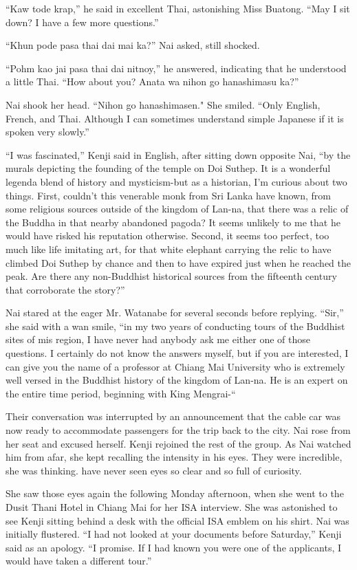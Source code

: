 \documentclass[]{article}
\begin{document}
{“Kaw tode krap,” he said in excellent Thai, astonishing Miss Buatong.  “May I sit down? I have a few more questions.”

“Khun pode pasa thai dai mai ka?” Nai asked, still shocked.

“Pohm kao jai pasa thai dai nitnoy,” he answered, indicating that he understood a little Thai.  “How about you? Anata wa nihon go hanashimasu ka?”

Nai shook her head.  “Nihon go hanashimasen."  She smiled.  “Only English, French, and Thai.  Although I can sometimes understand simple Japanese if it is spoken very slowly.”

“I was fascinated,” Kenji said in English, after sitting down opposite Nai, “by the murals depicting the founding of the temple on Doi Suthep.  It is a wonderful legenda blend of history and mysticism-but as a historian, I’m curious about two things.  First, couldn’t this venerable monk from Sri Lanka have known, from some religious sources outside of the kingdom of Lan-na, that there was a relic of the Buddha in that nearby abandoned pagoda? It seems unlikely to me that he would have risked his reputation otherwise.  Second, it seems too perfect, too much like life imitating art, for that white elephant carrying the relic to have climbed Doi Suthep by chance and then to have expired just when he reached the peak.  Are there any non-Buddhist historical sources from the fifteenth century that corroborate the story?”

Nai stared at the eager Mr.  Watanabe for several seconds before replying.  “Sir,” she said with a wan smile, “in my two years of conducting tours of the Buddhist sites of mis region, I have never had anybody ask me either one of those questions.  I certainly do not know the answers myself, but if you are interested, I can give you the name of a professor at Chiang Mai University who is extremely well versed in the Buddhist history of the kingdom of Lan-na.  He is an expert on the entire time period, beginning with King Mengrai-“

Their conversation was interrupted by an announcement that the cable car was now ready to accommodate passengers for the trip back to the city.  Nai rose from her seat and excused herself.  Kenji rejoined the rest of the group.  As Nai watched him from afar, she kept recalling the intensity in his eyes.  They were incredible, she was thinking.  have never seen eyes so clear and so full of curiosity.

She saw those eyes again the following Monday afternoon, when she went to the Dusit Thani Hotel in Chiang Mai for her ISA interview.  She was astonished to see Kenji sitting behind a desk with the official ISA emblem on his shirt.  Nai was initially flustered.  “I had not looked at your documents before Saturday,” Kenji said as an apology.  “I promise.  If I had known you were one of the applicants, I would have taken a different tour.”

}
\end{document}
